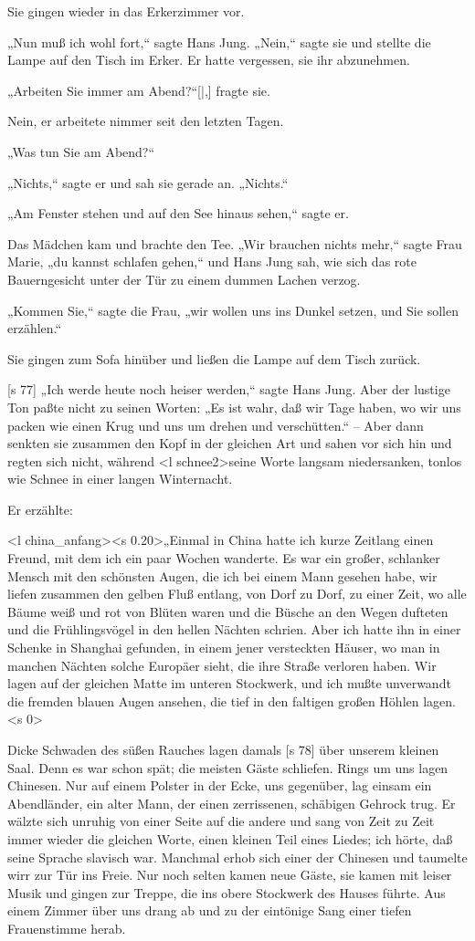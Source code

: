 Sie gingen wieder in das Erkerzimmer vor.

„Nun muß ich wohl fort,“ sagte Hans Jung.
„Nein,“ sagte sie und stellte die Lampe auf den Tisch
im Erker. Er hatte vergessen, sie ihr abzunehmen.

„Arbeiten Sie immer am Abend?“[|,] fragte sie.

Nein, er arbeitete nimmer seit den letzten Tagen.

„Was tun Sie am Abend?“

„Nichts,“ sagte er und sah sie gerade an. „Nichts.“

„Am Fenster stehen und auf den See hinaus­
sehen,“ sagte er.

Das Mädchen kam und brachte den Tee. „Wir
brauchen nichts mehr,“ sagte Frau Marie, „du kannst
schlafen gehen,“ und Hans Jung sah, wie sich das
rote Bauerngesicht unter der Tür zu einem dummen
Lachen verzog.

„Kommen Sie,“ sagte die Frau, „wir wollen uns
ins Dunkel setzen, und Sie sollen erzählen.“

Sie gingen zum Sofa hinüber und ließen die
Lampe auf dem Tisch zurück.

[s 77]
„Ich werde heute noch heiser werden,“ sagte
Hans Jung. Aber der lustige Ton paßte nicht zu
seinen Worten: „Es ist wahr, daß wir Tage haben,
wo wir uns packen wie einen Krug und uns um­
drehen und verschütten.“ – Aber dann senkten sie
zusammen den Kopf in der gleichen Art und sahen
vor sich hin und regten sich nicht, während <l schnee2>seine
Worte langsam niedersanken, tonlos wie Schnee in
einer langen Winternacht.

Er erzählte:

<l china_anfang><s 0.20>„Einmal in China hatte ich kurze Zeitlang einen
Freund, mit dem ich ein paar Wochen wanderte.
Es war ein großer, schlanker Mensch mit den schönsten
Augen, die ich bei einem Mann gesehen habe, wir
liefen zusammen den gelben Fluß entlang, von Dorf
zu Dorf, zu einer Zeit, wo alle Bäume weiß und
rot von Blüten waren und die Büsche an den Wegen
dufteten und die Frühlingsvögel in den hellen Nächten
schrien. Aber ich hatte ihn in einer Schenke in
Shanghai gefunden, in einem jener versteckten Häuser,
wo man in manchen Nächten solche Europäer sieht,
die ihre Straße verloren haben. Wir lagen auf der
gleichen Matte im unteren Stockwerk, und ich mußte
unverwandt die fremden blauen Augen ansehen, die
tief in den faltigen großen Höhlen lagen.<s 0>

Dicke Schwaden des süßen Rauches lagen damals
[s 78]
über unserem kleinen Saal. Denn es war schon spät;
die meisten Gäste schliefen. Rings um uns lagen
Chinesen. Nur auf einem Polster in der Ecke, uns
gegenüber, lag einsam ein Abendländer, ein alter
Mann, der einen zerrissenen, schäbigen Gehrock trug.
Er wälzte sich unruhig von einer Seite auf die andere
und sang von Zeit zu Zeit immer wieder die gleichen
Worte, einen kleinen Teil eines Liedes; ich hörte,
daß seine Sprache slavisch war. Manchmal erhob
sich einer der Chinesen und taumelte wirr zur Tür
ins Freie. Nur noch selten kamen neue Gäste, sie
kamen mit leiser Musik und gingen zur Treppe, die
ins obere Stockwerk des Hauses führte. Aus einem
Zimmer über uns drang ab und zu der eintönige
Sang einer tiefen Frauenstimme herab.

